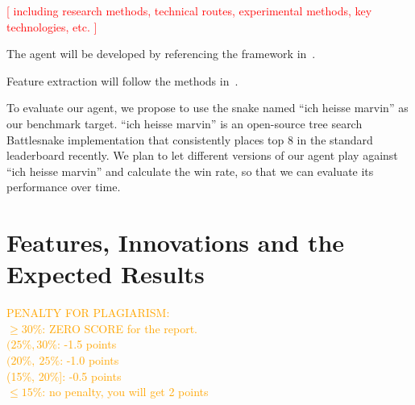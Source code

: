 \documentclass[a4paper]{article}
\newcommand{\todo}[1]{\textcolor{red}{[ #1 ]}}
\newcommand{\instruction}[1]{\textcolor{orange}{#1}}
\begin{document}
\todo{including research methods, technical routes, experimental methods,
    key technologies, etc.}

The agent will be developed by referencing the framework
in~\cite{chung2020battlesnake}.

Feature extraction will follow the methods in~\cite{siddiqui2020multiagent}.

To evaluate our agent,
we propose to use the snake named ``ich heisse marvin'' as our benchmark target.
``ich heisse marvin'' is an open-source tree search Battlesnake implementation
that consistently places top 8 in the standard leaderboard recently.
We plan to let different versions of our agent play against ``ich heisse
marvin'' and calculate the win rate,
so that we can evaluate its performance over time.

\section{Features, Innovations and the Expected Results}

\instruction{
    PENALTY FOR PLAGIARISM:\\
    \(\geq 30\%\): ZERO SCORE for the report.\\
    \((25\%,30\%\): -1.5 points\\
    \((20\%,\ 25\%\): -1.0 points\\
    (15\%, 20\%]: -0.5 points\\
    \(\leq 15\%\): no penalty, you will get 2 points
}

\printbibliography
\end{document}
